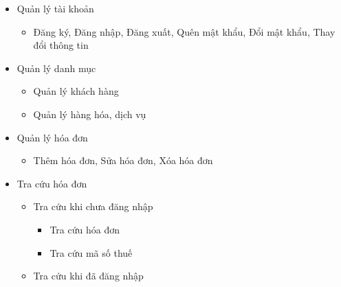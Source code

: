 



\begin{itemize}

\item Quản lý tài khoản

\begin{itemize}

\item Đăng ký, Đăng nhập, Đăng xuất, Quên mật khẩu, Đổi mật khẩu, Thay đổi thông tin

\end{itemize}

\item Quản lý danh mục

\begin{itemize}

\item Quản lý khách hàng

\item Quản lý hàng hóa, dịch vụ

\end{itemize}

\item Quản lý hóa đơn

\begin{itemize}

\item Thêm hóa đơn, Sửa hóa đơn, Xóa hóa đơn

\end{itemize}

\item Tra cứu hóa đơn

\begin{itemize}

\item Tra cứu khi chưa đăng nhập

\begin{itemize}

\item Tra cứu hóa đơn

\item Tra cứu mã số thuế

\end{itemize}

\item Tra cứu khi đã đăng nhập


\end{itemize}
\end{itemize}
